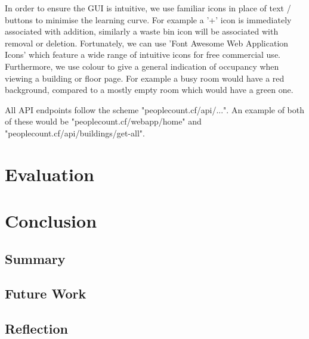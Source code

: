 \documentclass{l4proj}
\begin{document}
In order to ensure the GUI is intuitive, we use familiar icons in place of text / buttons to minimise the learning curve. For example a '+' icon is immediately associated with addition, similarly a waste bin icon will be associated with removal or deletion. Fortunately, we can use 'Font Awesome Web Application Icons' which feature a wide range of intuitive icons for free commercial use. Furthermore, we use colour to give a general indication of occupancy when viewing a building or floor page. For example a busy room would have a red background, compared to a mostly empty room which would have a green one.

All API endpoints follow the scheme "peoplecount.cf/api/...". An example of both of these would be "peoplecount.cf/webapp/home" and "peoplecount.cf/api/buildings/get-all".




\chapter{Evaluation}



\chapter{Conclusion}
\section{Summary}
\section{Future Work}
\section{Reflection}
\end{document}
